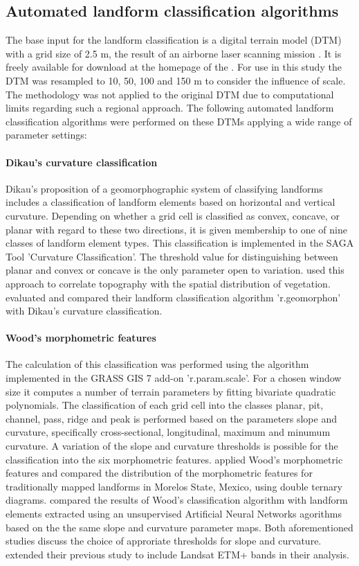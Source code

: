 \documentclass[preprint,12pt,authoryear]{elsarticle}
\begin{document}
\subsection{Automated landform classification algorithms}
The base input for the landform classification is a digital terrain model (DTM) with a grid size of 2.5 m, the result of an airborne laser scanning mission \citep{Wack2005}. It is freely available for download at the homepage of the \cite{DTM}. For use in this study the DTM was resampled to 10, 50, 100 and 150 m to consider the influence of scale. The methodology was not applied to the original DTM due to computational limits regarding such a regional approach. The following automated landform classification algorithms were performed on these DTMs applying a wide range of parameter settings:
\paragraph{Dikau's curvature classification \citep{Dikau1988}}
Dikau's proposition of a geomorphographic system of classifying landforms includes a classification of landform elements based on horizontal and vertical curvature. Depending on whether a grid cell is classified as convex, concave, or  planar with regard to these two directions, it is given membership to one of nine classes of landform element types. This classification is implemented in the SAGA Tool 'Curvature Classification'. The threshold value for distinguishing between planar and convex or concave is the only parameter open to variation. \cite{Hoersch2002} used this approach to correlate topography with the spatial distribution of vegetation. \cite{Jasiewicz2013} evaluated and compared their landform classification algorithm 'r.geomorphon' with Dikau's curvature classification.
\paragraph{Wood's morphometric features \citep{Wood1996}}
The calculation of this classification was performed using the algorithm implemented in the GRASS GIS 7  add-on 'r.param.scale'.  For a chosen window size it computes a number of terrain parameters by fitting bivariate quadratic polynomials.  The classification of each grid cell into the classes planar, pit, channel, pass, ridge and peak is performed based on the parameters slope and curvature, specifically cross-sectional, longitudinal, maximum and minumum curvature. A variation of  the slope and curvature thresholds is possible for the classification into the six morphometric features.
\cite{Bolongaro-Crevenna2005} applied Wood's morphometric features and compared the distribution of the morphometric features for traditionally mapped landforms in Morelos State, Mexico, using double ternary diagrams. \cite{Ehsani2008} compared the results of Wood's classification algorithm with landform elements extracted using  an unsupervised Artificial Neural Networks agorithms based on the the same slope and curvature parameter maps. Both aforementioned studies discuss the choice of approriate thresholds for slope and curvature. \cite{Ehsani2009} extended their previous study  to include Landsat ETM+ bands in their analysis.  
\end{document}
